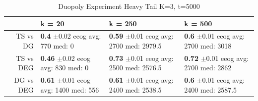 \documentclass[11pt,letterpaper]{article}
\begin{document}
\begin{table}[H]
\centering
\caption{Duopoly Experiment Heavy Tail K=3, t=5000} 
\begin{tabular}{rlll}
  \hline
 & k = 20 & k = 250 & k = 500 \\ 
  \hline
TS vs DG & \makecell{\textbf{0.4} $\pm$0.02\\ eeog \\ avg: 770\\ med: 0} & \makecell{\textbf{0.59} $\pm$0.01\\ eeog \\ avg: 2700\\ med: 2979.5} & \makecell{\textbf{0.6} $\pm$0.01\\ eeog \\ avg: 2700\\ med: 3018} \\ 
  TS vs DEG & \makecell{\textbf{0.46} $\pm$0.02\\ eeog \\ avg: 830\\ med: 0} & \makecell{\textbf{0.73} $\pm$0.01\\ eeog \\ avg: 2500\\ med: 2576.5} & \makecell{\textbf{0.72} $\pm$0.01\\ eeog \\ avg: 2700\\ med: 2862} \\ 
  DG vs DEG & \makecell{\textbf{0.61} $\pm$0.01\\ eeog \\ avg: 1400\\ med: 556} & \makecell{\textbf{0.61} $\pm$0.01\\ eeog \\ avg: 2400\\ med: 2538.5} & \makecell{\textbf{0.6} $\pm$0.01\\ eeog \\ avg: 2400\\ med: 2587.5} \\ 
   \hline
\end{tabular}
\end{table}
\end{document}
